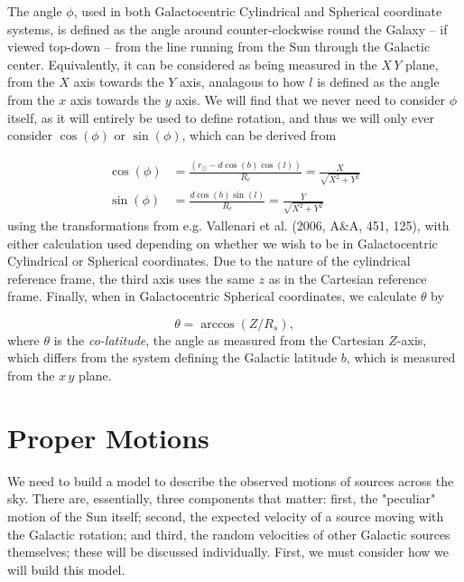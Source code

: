 \documentclass[fleqn,usenatbib]{mnras}
\begin{document}
The angle $\phi$, used in both Galactocentric Cylindrical and Spherical coordinate systems, is defined as the angle around counter-clockwise round the Galaxy -- if viewed top-down -- from the line running from the Sun through the Galactic center.
Equivalently, it can be considered as being measured in the $X\,Y$ plane, from the $X$ axis towards the $Y$ axis, analagous to how $l$ is defined as the angle from the $x$ axis towards the $y$ axis.
We will find that we never need to consider $\phi$ itself, as it will entirely be used to define rotation, and thus we will only ever consider $\cos(\phi)$ or $\sin(\phi)$, which can be derived from

\begin{align}
    \cos(\phi) &= \frac{(r_\odot - d \cos(b) \cos(l))}{R_c} = \frac{X}{\sqrt{X^2 + Y^2}} \\
    \sin(\phi) &= \frac{d \cos(b)\sin(l)}{R_c} = \frac{Y}{\sqrt{X^2 + Y^2}}
    \label{eq:cossinphi}
\end{align}
using the transformations from e.g. Vallenari et al. (2006, A\&A, 451, 125), with either calculation used depending on whether we wish to be in Galactocentric Cylindrical or Spherical coordinates.
Due to the nature of the cylindrical reference frame, the third axis uses the same $z$ as in the Cartesian reference frame.
Finally, when in Galactocentric Spherical coordinates, we calculate $\theta$ by

\begin{equation}
    \theta = \arccos(Z / R_s),
\end{equation}
where $\theta$ is the \textit{co-latitude}, the angle as measured from the Cartesian $Z$-axis, which differs from the system defining the Galactic latitude $b$, which is measured from the $x\,y$ plane.

\section{Proper Motions}
We need to build a model to describe the observed motions of sources across the sky.
There are, essentially, three components that matter: first, the "peculiar" motion of the Sun itself; second, the expected velocity of a source moving with the Galactic rotation; and third, the random velocities of other Galactic sources themselves; these will be discussed individually.
First, we must consider how we will build this model.
\end{document}
